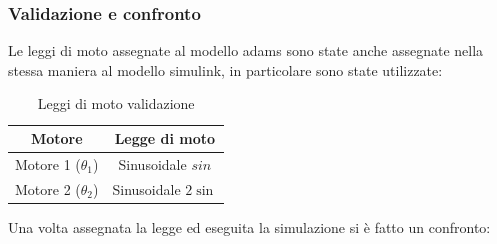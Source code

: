 \subsubsection*{Validazione e confronto}
Le leggi di moto assegnate al modello adams sono state anche assegnate nella stessa maniera al modello simulink, in particolare sono state utilizzate: 
\begin{table}[h!]
	\centering
	\begin{tabular}{|c|c|} 
		\hline
		Motore & Legge di moto  \\
		\hline\hline
		Motore 1 ($\theta_1$)& Sinusoidale $sin$ \\
		Motore 2 ($\theta_2$)& Sinusoidale $2\sin$ \\
		\hline
	\end{tabular}
	\caption{Leggi di moto validazione}
	\label{table:ldmAdams}
\end{table}
Una volta assegnata la legge ed eseguita la simulazione si è fatto un confronto:
